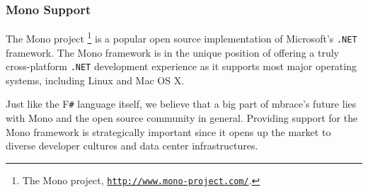 \documentclass[9pt,a4paper]{article}
\newcommand{\mbrace}{mbrace}
\newcommand{\fsharp}{F\texttt \#}
\newcommand{\dotnet}{\texttt{\hbox{.}NET}}
\newcommand{\samehref}[1]{\href{#1}{\texttt{#1}}}
\begin{document}
\subsubsection*{Mono Support}

The Mono project%
\footnote{The Mono project, \samehref{http://www.mono-project.com/}.}
is a popular open source implementation of Microsoft's \dotnet{} framework.
The Mono framework is in the unique position of offering a truly cross-platform
\dotnet{} development experience as it supports most major operating systems,
including Linux and Mac OS X.

Just like the \fsharp{} language itself, we believe that a big part of \mbrace{}'s 
future lies with Mono and the open source community in general. Providing support
for the Mono framework is strategically important since it opens up the market
to diverse developer cultures and data center infrastructures.




%
%
%

%
%
\end{document}

